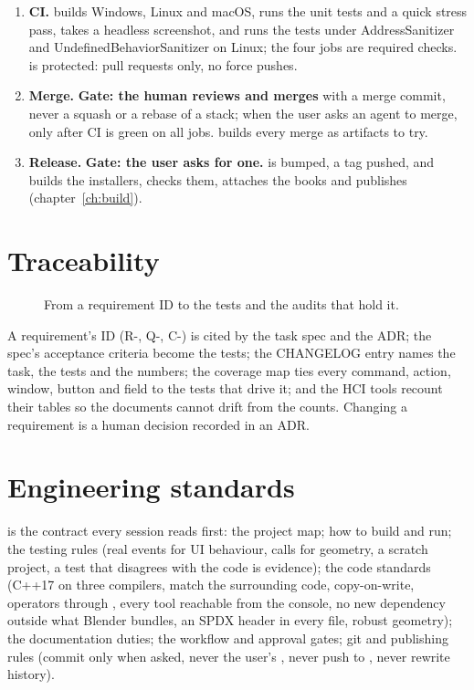 \begin{enumerate}
     trailer; pull requests say they were generated with Claude Code. A round's PR is stacked on the
    previous round's branch when the rounds depend on each other, and the body says which PRs a merge also merges;
    parallel passes' changelog and README changes travel as fragments (below).
  \item \textbf{CI.}  builds Windows, Linux and macOS, runs the unit tests and a quick stress pass, takes
    a headless screenshot, and runs the tests under AddressSanitizer and UndefinedBehaviorSanitizer on Linux; the four
    jobs are required checks.  is protected: pull requests only, no force pushes.
  \item \textbf{Merge.} \textbf{Gate: the human reviews and merges} with a merge commit, never a squash or a rebase of a
    stack; when the user asks an agent to merge, only after CI is green on all jobs.  builds every
    merge as artifacts to try.
  \item \textbf{Release.} \textbf{Gate: the user asks for one.}  is bumped, a  tag pushed, and
     builds the installers, checks them, attaches the books and publishes (chapter~\ref{ch:build}).
\end{enumerate}

\section{Traceability}
\begin{figure}[H]
  \centering
  \resizebox{\textwidth}{!}{}
  \caption{From a requirement ID to the tests and the audits that hold it.}
  \label{fig:trace}
\end{figure}

A requirement's ID (R-, Q-, C-) is cited by the task spec and the ADR; the spec's acceptance criteria become the
tests; the CHANGELOG entry names the task, the tests and the numbers; the coverage map ties every command, action,
window, button and field to the tests that drive it; and the HCI tools recount their tables so the documents cannot
drift from the counts. Changing a requirement is a human decision recorded in an ADR.

\section{Engineering standards}
 is the contract every session reads first: the project map; how to build and run; the testing rules
(real events for UI behaviour,  calls for geometry, a scratch project, a test that disagrees with the code
is evidence); the code standards (C++17 on three compilers, match the surrounding code, copy-on-write, operators
through , every tool reachable from the console, no new dependency outside what Blender bundles, an SPDX
header in every file, robust geometry); the documentation duties; the workflow and approval gates; git and publishing
rules (commit only when asked, never the user's , never push to , never rewrite history).

